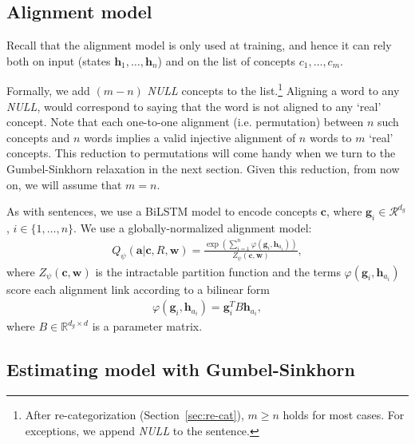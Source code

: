 \documentclass[11pt,a4paper]{article}
\begin{document}
\subsection{Alignment model}
\label{sec:align-mod}
Recall that the alignment model is only used at training, and hence it can rely both on input (states $\mathbf{h}_1, \ldots, \mathbf{h}_n$) and on the list of concepts $c_1, \ldots, c_m$. 

Formally, we add $(m-n)$
\textit{NULL} concepts to the list.\footnote{After re-categorization (Section~\ref{sec:re-cat}), $m \geq n$ holds for most cases. For exceptions, we append \textit{NULL} to the sentence.} 
Aligning a word to any \textit{NULL}, would correspond to saying that the word is not aligned to any `real' concept. Note that each one-to-one alignment (i.e. permutation) between $n$ such concepts and $n$ words implies a valid  injective alignment of $n$ words to $m$ `real' concepts. This reduction to permutations will come handy when we turn to the Gumbel-Sinkhorn relaxation in the next section. 
Given this reduction, from now on, we will assume that $m = n$. 

As with sentences, we use a BiLSTM model to encode concepts $\mathbf{c}$, where $\mathbf{g}_i \in \mathcal{R}^{d_g}$, $i \in \{1, \ldots, n\}$. We use a globally-normalized alignment model:
\begin{align}
\nonumber
Q_{\psi}( \mathbf{a} | \mathbf{c}, R, \mathbf{w}) =
\frac{
\exp(\sum_{i=1}^{n}{
      \varphi(\mathbf{g}_i, \mathbf{h}_{a_i})
   })
}
{
Z_{\psi} (\mathbf{c}, \mathbf{w}) 
},
\end{align}
where $Z_{\psi} (\mathbf{c}, \mathbf{w})$ is the intractable partition function and the terms $\varphi(\mathbf{g}_i, \mathbf{h}_{a_i})$ score each alignment link according to a bilinear form
\begin{align}
\varphi(\mathbf{g}_i, \mathbf{h}_{a_i}) = \mathbf{g}_i^T B \mathbf{h}_{a_i},
\end{align}
where $B \in \mathbb{R}^{d_g \times d}$ is a parameter matrix.

\subsection{Estimating model with Gumbel-Sinkhorn}\label{sec:sink}
\end{document}
